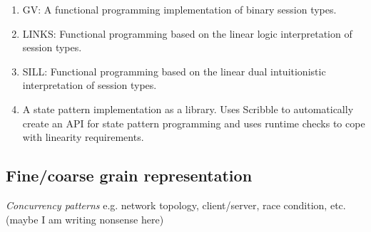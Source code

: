 \begin{enumerate}
	\item	GV:			A functional programming implementation of binary session types.
	\item	LINKS:		Functional programming based on the linear logic interpretation of session types.
	\item	SILL:		Functional programming based on the linear dual intuitionistic interpretation of session types.

	\item	A state pattern implementation as a library. Uses Scribble to automatically
			create an API for state pattern programming and uses runtime checks to
			cope with linearity requirements.

\end{enumerate}

\subsection{Fine/coarse grain representation}

{\em Concurrency patterns} e.g. network topology, client/server, race condition, etc. (maybe I am writing nonsense here)
